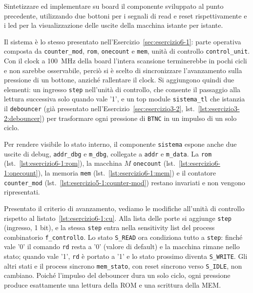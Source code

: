 \label{sec:esercizio6-2}

\begin{traccia}
Sintetizzare ed implementare su board il componente sviluppato al punto precedente, utilizzando due bottoni per i segnali di read e reset rispettivamente e i led per la visualizzazione delle uscite della macchina istante per istante.
\end{traccia}

\progetto

Il sistema è lo stesso presentato nell'Esercizio~\ref{sec:esercizio6-1}: parte operativa composta da \texttt{counter\_mod}, \texttt{rom}, \texttt{onecount} e \texttt{mem}, unità di controllo \texttt{control\_unit}. Con il clock a \SI{100}{MHz} della board l'intera scansione terminerebbe in pochi cicli e non sarebbe osservabile, perciò si è scelto di sincronizzare l'avanzamento sulla pressione di un bottone, anziché rallentare il clock. Si aggiungono quindi due elementi: un ingresso \texttt{step} nell'unità di controllo, che consente il passaggio alla lettura successiva solo quando vale '1', e un top module \texttt{sistema\_tl} che istanzia il \texttt{debouncer} (già presentato nell'Esercizio~\ref{sec:esercizio3-2}, lst.~\ref{lst:esercizio3-2:debouncer}) per trasformare ogni pressione di \texttt{BTNC} in un impulso di un solo ciclo.

Per rendere visibile lo stato interno, il componente \texttt{sistema} espone anche due uscite di debug, \texttt{addr\_dbg} e \texttt{m\_dbg}, collegate a \texttt{addr} e \texttt{m\_data}. La \texttt{rom} (lst.~\ref{lst:esercizio6-1:rom}), la macchina $M$ \texttt{onecount} (lst.~\ref{lst:esercizio6-1:onecount}), la memoria \texttt{mem} (lst.~\ref{lst:esercizio6-1:mem}) e il contatore \texttt{counter\_mod} (lst.~\ref{lst:esercizio5-1:counter-mod}) restano invariati e non vengono ripresentati.

\implementazione

Presentato il criterio di avanzamento, vediamo le modifiche all'unità di controllo rispetto al listato~\ref{lst:esercizio6-1:cu}. Alla lista delle porte si aggiunge \texttt{step} (ingresso, 1 bit), e la stessa \texttt{step} entra nella sensitivity list del process combinatorio \texttt{f\_controllo}. Lo stato \texttt{S\_READ} ora condiziona tutto a \texttt{step}: finché vale '0' il comando \texttt{rd} resta a '0' (valore di default) e la macchina rimane nello stato; quando vale '1', \texttt{rd} è portato a '1' e lo stato prossimo diventa \texttt{S\_WRITE}. Gli altri stati e il process sincrono \texttt{mem\_stato}, con reset sincrono verso \texttt{S\_IDLE}, non cambiano. Poiché l'impulso del debouncer dura un solo ciclo, ogni pressione produce esattamente una lettura della ROM e una scrittura della MEM.

